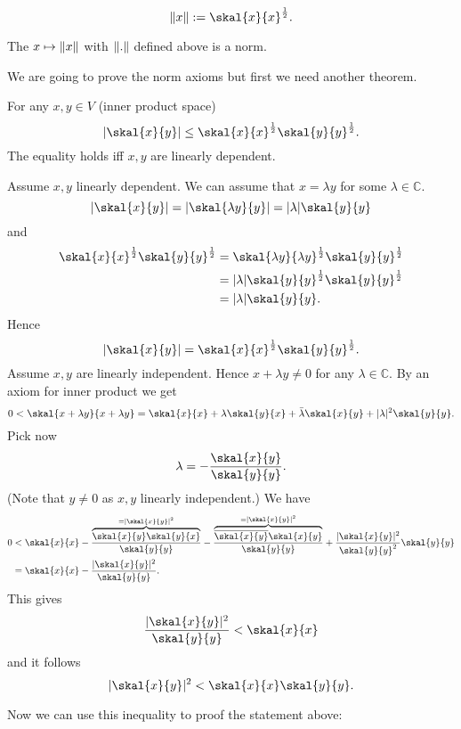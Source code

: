 \[
	\norm{x} := \skal{x}{x}^{\frac{1}{2}}.
\]
\begin{satz}
	The $x \mapsto  \norm{x}$ with $\norm{.}$ defined above is a norm.
\end{satz}
We are going to prove the norm axioms but first we need another theorem.
	\begin{theorem}
		For any $x,y \in V$ (inner product space) 
		\[
			\abs{\skal{x}{y}} \leq \skal{x}{x}^{\frac{1}{2}} \skal{y}{y}^{\frac{1}{2}}.
		\]
		The equality holds iff $x,y$ are linearly dependent.
	\end{theorem}
	\begin{beweis}
		Assume $x,y$ linearly dependent. We can assume that $x= \lambda y$ for some $\lambda \in \mathbb{C} $.
		\[
			\abs{\skal{x}{y}} = \abs{ \skal{\lambda y}{y}} = \abs{\lambda} \skal{y}{y}
		\]
		and
		\begin{align*}
					\skal{x}{x}^{\frac{1}{2}} \skal{y}{y}^{\frac{1}{2}} &= \skal{\lambda y}{\lambda y}^{\frac{1}{2}} \skal{y}{y}^{\frac{1}{2}} \\
					&= \abs{\lambda} \skal{y}{y}^{\frac{1}{2}} \skal{y}{y}^{\frac{1}{2}} \\
					&= \abs{\lambda} \skal{y}{y}.
		\end{align*}
		Hence \[
			\abs{\skal{x}{y}} = \skal{x}{x}^{\frac{1}{2}} \skal{y}{y}^{\frac{1}{2}}.
		\]
		Assume $x,y$ are linearly independent. Hence $x + \lambda y \neq 0$ for any $\lambda \in \mathbb{C}$. By an axiom for inner product we get
		\[
			0< \skal{x+ \lambda y}{x + \lambda y} = \skal{x}{x} + \lambda \skal{y}{x} + \bar{\lambda} \skal{x}{y} + \abs{\lambda}^2 \skal{y}{y}.
		\]
		Pick now
		\[
			\lambda = - \frac{\skal{x}{y}}{\skal{y}{y}}.
		\]
		(Note that $y \neq 0$ as $x,y$ linearly independent.)
		We have \begin{align*}
						0 &< \skal{x}{x} - \frac{\overset{= \abs{\skal{x}{y}}^2}{\overbrace{\skal{x}{y}\skal{y}{x}}}}{\skal{y}{y}} - \frac{\overset{= \abs{\skal{x}{y}}^2}{\overbrace{\overline{\skal{x}{y}}\skal{x}{y}}}}{\skal{y}{y}}+ \frac{\abs{\skal{x}{y}}^2}{\skal{y}{y}^2} \skal{y}{y} \\
						&= \skal{x}{x} - \frac{\abs{\skal{x}{y}}^2}{\skal{y}{y}}.
		\end{align*}
		This gives
		\[
			\frac{\abs{\skal{x}{y}}^2}{\skal{y}{y}} < \skal{x}{x}
		\]
		and it follows
		\[
			\abs{\skal{x}{y}}^2 < \skal{x}{x} \skal{y}{y}.
		\]
	\end{beweis}
Now we can use this inequality to proof the statement above:
